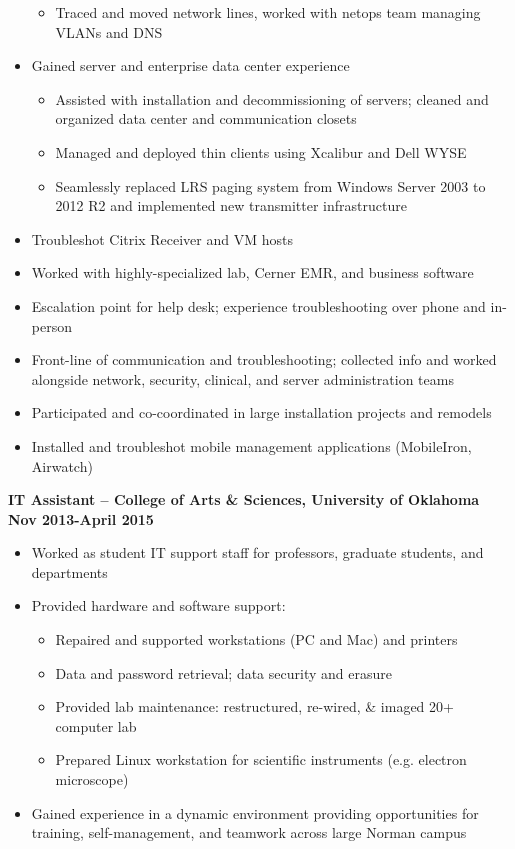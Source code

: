 \documentclass[line]{res}
\begin{document}
\begin{resume}
\begin{itemize}
\begin{itemize}
				\item Traced and moved network lines, worked with netops team managing VLANs and DNS
			\end{itemize}		
		\item Gained server and enterprise data center experience
			\begin{itemize}
				\item Assisted with installation and decommissioning of servers; cleaned and organized data center and communication closets
				\item Managed and deployed thin clients using Xcalibur and Dell WYSE
				\item Seamlessly replaced LRS paging system from Windows Server 2003 to 2012 R2 and implemented new transmitter infrastructure
			\end{itemize}
		\item Troubleshot Citrix Receiver and VM hosts
		\item Worked with highly-specialized lab, Cerner EMR, and business software
		\item Escalation point for help desk; experience troubleshooting over phone and in-person
		\item Front-line of communication and troubleshooting; collected info and worked alongside network, security, clinical, and server administration teams
		\item Participated and co-coordinated in large installation projects and remodels
		\item Installed and troubleshot mobile management applications (MobileIron, Airwatch)
	\end{itemize}
\textbf{IT Assistant -- College of Arts \& Sciences, University of Oklahoma}
\newline
\textbf{Nov 2013-April 2015}
\begin{itemize}
	\item Worked as student IT support staff for professors, graduate students, and departments
	\item Provided hardware and software support:
		\begin{itemize}
			\item Repaired and supported workstations (PC and Mac) and printers
			\item Data and password retrieval; data security and erasure
			\item Provided lab maintenance: restructured, re-wired, \& imaged 20+ computer lab 
			\item Prepared Linux workstation for scientific instruments (e.g. electron microscope)
		\end{itemize}
	\item Gained experience in a dynamic environment providing opportunities for training, self-management, and teamwork across large Norman campus
\end{itemize}


\end{resume}
\end{document}
